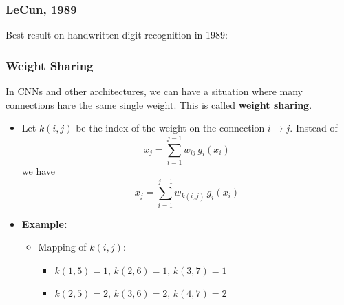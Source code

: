 \subsubsection{LeCun, 1989}
\begin{example}
    Best result on handwritten digit recognition in 1989:
\end{example}

\subsubsection{Weight Sharing}
\begin{summary}
    In CNNs and other architectures, we can have a situation where many connections hare the same single weight. This is called \textbf{weight sharing}.
    \begin{itemize}
        \item Let \( k(i, j) \) be the index of the weight on the connection \( i \rightarrow j \). Instead of
        \[
        x_j = \sum_{i=1}^{j-1} w_{ij} \, g_i(x_i)
        \]
        we have
        \[
        x_j = \sum_{i=1}^{j-1} w_{k(i,j)} \, g_i(x_i)
        \]
    
        \item \textbf{Example:}
        \begin{itemize}
            \item Mapping of \( k(i, j) \):
            \begin{itemize}
                \item \( k(1,5) = 1 \), \( k(2,6) = 1 \), \( k(3,7) = 1 \)
                \item \( k(2,5) = 2 \), \( k(3,6) = 2 \), \( k(4,7) = 2 \)
            \end{itemize}
        \end{itemize}
    \end{itemize}
\end{summary}


